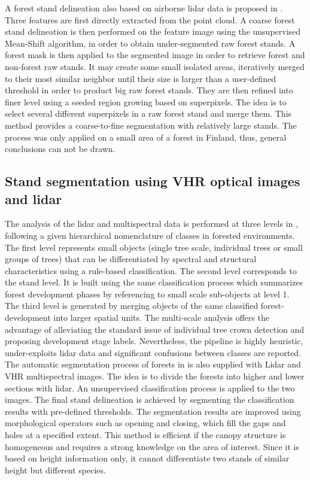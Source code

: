 A forest stand delineation also based on airborne lidar data is proposed in \citep{wu2014data}. Three features are first directly extracted from the point cloud. A coarse forest stand delineation is then performed on the feature image using the unsupervised Mean-Shift algorithm, in order to obtain under-segmented raw forest stands. A forest mask is then applied to the segmented image in order to retrieve forest and non-forest raw stands. It may create some small isolated areas, iteratively merged to their most similar neighbor until their size is larger than a user-defined threshold in order to product big raw forest stands. They are then refined into finer level using a seeded region growing based on superpixels. The idea is to select several different superpixels in a raw forest stand and merge them. This method provides a coarse-to-fine segmentation with relatively large stands. The process was only applied on a small area of a forest in Finland, thus, general conclusions can not be drawn. \\

\subsection{Stand segmentation using VHR optical images and lidar}
The analysis of the lidar and multispectral data is performed at three levels in \citep{tiede2004object}, following a given hierarchical nomenclature of classes in forested environments. The first level represents small objects (single tree scale, individual trees or small groups of trees) that can be differentiated by spectral and structural characteristics using a rule-based classification. The second level corresponds to the stand level. It is built using the same classification process which summarizes forest development phases by referencing to small scale sub-objects at level 1. The third level is generated by merging objects of the same classified forest-development into larger spatial units. The multi-scale analysis offers the advantage of alleviating the standard issue of individual tree crown detection and proposing development stage labels. Nevertheless, the pipeline is highly heuristic, under-exploits lidar data and significant confusions between classes are reported.\\

The automatic segmentation process of forests in \citep{diedershagen2004automatic} is also supplied with Lidar and VHR multispectral images. The idea is to divide the forests into higher and lower sections with lidar. An unsupervised classification process is applied to the two images. The final stand delineation is achieved by segmenting the classification results with pre-defined thresholds. The segmentation results are improved using morphological operators such as opening and closing, which fill the gaps and holes at a specified extent. This method is efficient if the canopy structure is homogeneous and requires a strong knowledge on the area of interest. Since it is based on height information only, it cannot differentiate two stands of similar height but different species.\\


